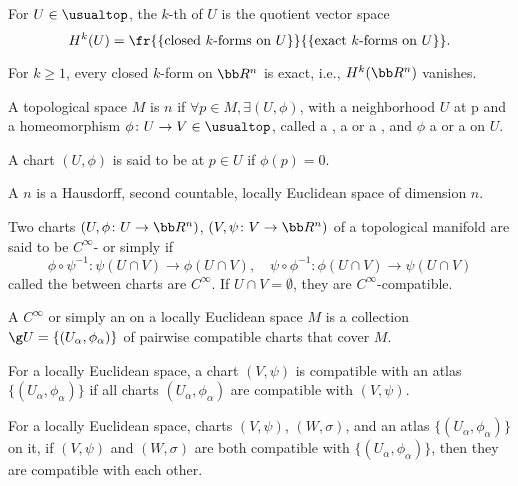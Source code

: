 For $U \in \usualtop$, the $k$-th  of $U$ is the quotient vector space
\[
H^k (U) = \fr{\{ \text{closed}\ k\text{-forms on}\ U\}}{\{\text{exact}\ k\text{-forms on}\ U\}}.
\]

For $k \ge 1$, every closed $k$-form on $\bb R^n$ is exact, i.e., $H^k (\bb R^n)$ vanishes.

A topological space $M$ is  $n$ if $\forall p \in M,\exists (U, \phi)$, with a neighborhood $U$ at p and a homeomorphism $\phi \colon U \to V \in \usualtop$, called a , a  or a , and $\phi$ a  or a  on $U$.

A chart $(U, \phi)$ is said to be  at $p \in U$ if $\phi(p) = 0$.

A  $n$ is a Hausdorff, second countable, locally Euclidean space of dimension $n$.

Two charts $(U, \phi \colon U \to \bb R^n)$, $(V, \psi \colon V \to \bb R^n)$ of a topological manifold are said to be $C^\infty$- or simply  if
\[
\phi \circ \psi^{-1} \colon \psi(U \cap V) \to \phi (U \cap V),\quad \psi \circ \phi^{-1} \colon \phi(U\cap V) \to \psi(U\cap V)
\]
called the  between charts are $C^\infty$. If $U \cap V = \emptyset$, they are $C^\infty$-compatible.

A $C^\infty$  or simply an  on a locally Euclidean space $M$ is a collection $\g U = \{ (U_\alpha, \phi_\alpha) \}$ of pairwise compatible charts that cover $M$.

For a locally Euclidean space, a chart $(V, \psi)$ is compatible with an atlas $\{(U_\alpha, \phi_\alpha)\}$ if all charts $(U_\alpha, \phi_\alpha)$ are compatible with $(V, \psi)$.

For a locally Euclidean space, charts $(V, \psi)$, $(W, \sigma)$, and an atlas $\{( U_\alpha, \phi_\alpha)\}$ on it, if $(V, \psi)$ and $(W, \sigma)$ are both compatible with $\{(U_\alpha, \phi_\alpha)\}$, then they are compatible with each other.

